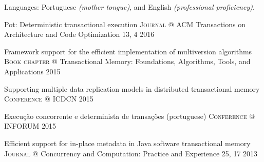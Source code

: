 \documentclass[10pt,a4paper]{article}
\begin{document}
\spacedhrule{0.5em}{-0.4em}




\inlineheadsection
  {Languages:}
  {Portuguese \emph{(mother tongue)}, and English \emph{(professional proficiency)}.}


\spacedhrule{1.6em}{-0.4em}



\headedsection
  {Pot: Deterministic transactional execution}
  {\textsc{Journal}} {%
  \headedsubsection
    {@ ACM Transactions on Architecture and Code Optimization 13, 4}
    {2016}
    {}
}

\headedsection
  {Framework support for the efficient implementation of multiversion algorithms}
  {\textsc{Book chapter}} {%
  \headedsubsection
    {@ Transactional Memory: Foundations, Algorithms, Tools, and Applications}
    {2015}
    {}
}

\headedsection
  {Supporting multiple data replication models in distributed transactional memory}
  {\textsc{Conference}} {%
  \headedsubsection
    {@ ICDCN}
    {2015}
    {}
}

\headedsection
  {Execu\c{c}\~{a}o concorrente e determinista de transa\c{c}\~{o}es (portuguese)}
  {\textsc{Conference}} {%
  \headedsubsection
    {@ INFORUM}
    {2015}
    {}
}

\headedsection
  {Efficient support for in-place metadata in Java software transactional memory}
  {\textsc{Journal}} {%
  \headedsubsection
    {@ Concurrency and Computation: Practice and Experience 25, 17}
    {2013}
    {}
}
\end{document}
